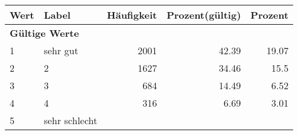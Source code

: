      \begin{longtable}{lXrrr}
     \toprule
     \textbf{Wert} & \textbf{Label} & \textbf{Häufigkeit} & \textbf{Prozent(gültig)} & \textbf{Prozent} \\
     \endhead
     \midrule
     \multicolumn{5}{l}{\textbf{Gültige Werte}}\\

     1 &
     \multicolumn{1}{X}{ sehr gut   } &


       \num{2001} &
       \num[round-mode=places,round-precision=2]{42.39} &
         \num[round-mode=places,round-precision=2]{19.07} \\

     2 &
     \multicolumn{1}{X}{ 2   } &


       \num{1627} &
       \num[round-mode=places,round-precision=2]{34.46} &
         \num[round-mode=places,round-precision=2]{15.5} \\

     3 &
     \multicolumn{1}{X}{ 3   } &


       \num{684} &
       \num[round-mode=places,round-precision=2]{14.49} &
         \num[round-mode=places,round-precision=2]{6.52} \\

     4 &
     \multicolumn{1}{X}{ 4   } &


       \num{316} &
       \num[round-mode=places,round-precision=2]{6.69} &
         \num[round-mode=places,round-precision=2]{3.01} \\

     5 &
     \multicolumn{1}{X}{ sehr schlecht   } &



\end{longtable}

